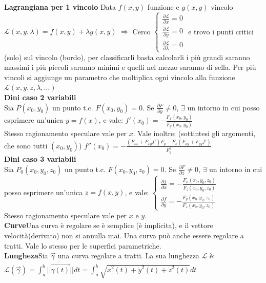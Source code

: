 \documentclass[a4paper, oneside]{article}
\newcommand{\tab}{\hspace*{2em}}
\begin{document}
\textbf{Lagrangiana per 1 vincolo} Data $f(x,y)$ funzione e $g(x,y)$ vincolo \tab $\mathcal{L}(x,y,\lambda)=f(x,y)+\lambda g(x,y)$ $\Rightarrow$ Cerco $\begin{cases}
    \frac{\partial \mathcal{L}}{\partial x}=0\\
    \frac{\partial \mathcal{L}}{\partial y}=0\\
    \frac{\partial \mathcal{L}}{\partial \lambda}=0
\end{cases}$ e trovo i punti critici (solo) sul vincolo (bordo), per classificarli basta calcolarli i più grandi saranno massimi i più piccoli saranno minimi e quelli nel mezzo saranno di sella. Per più vincoli si aggiunge un parametro che moltiplica ogni vincolo alla funzione $\mathcal{L}(x,y,z,\lambda, \dots)$\\
\textbf{Dini caso 2 variabili}\\
    Sia $P(x_0,y_0)$ un punto t.c. $F(x_0,y_0)=0$. Se $\displaystyle \frac{\partial F}{\partial y} \ne 0$, $\exists$ un intorno in cui posso esprimere un'unica $y=f(x)$, e vale: $f'(x_0)=-\frac{F_x(x_0,y_0)}{F_y(x_0,y_0)}$\\
    Stesso ragionamento speculare vale per $x$. \tab
    Vale inoltre: (sottintesi gli argomenti, che sono tutti $(x_0,y_0)$) \tab
    $f''(x_0)=-\frac{(F_{xx}+F_{xy}f')F_y-F_x(F_{xy}+F_{yy}f')}{F_y^2}$\\
\textbf{Dini caso 3 variabili}\\
    Sia $P_0(x_0,y_0,z_0)$ un punto t.c. $F(x_0,y_0,z_0)=0$. Se $\displaystyle \frac{\partial F}{\partial z} \ne 0$, $\exists$ un intorno in cui posso esprimere un'unica $z=f(x,y)$, e vale: $\begin{cases}
        \frac{\partial f}{\partial x}=-\frac{F_x(x_0,y_0,z_0)}{F_z(x_0,y_0,z_0)}\\
        \frac{\partial f}{\partial y}=-\frac{F_y(x_0,y_0,z_0)}{F_z(x_0,y_0,z_0)}
    \end{cases}$\\
    Stesso ragionamento speculare vale per $x$ e $y$.\\
\textbf{Curve}Una curva è regolare se è semplice (è implicita), e il vettore velocità(derivato) non si annulla mai. Una curva può anche essere regolare a tratti. Vale lo stesso per le superfici parametriche.\\
\textbf{Lungheza}Sia $\vec{\gamma}$ una curva regolare a tratti. La sua lunghezza $\displaystyle \mathcal{L}$ è: $\displaystyle \mathcal{L}(\vec{\gamma})=\int_a^b||\dot{\vec{\gamma (t)}}||dt = \int_{a}^{b} \sqrt{\dot{x}^2(t) +\dot{y}^2(t) + \dot{z}^2(t)} dt$\\
\end{document}
